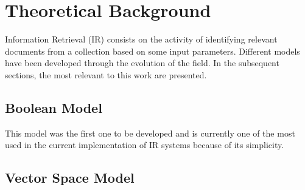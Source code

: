 \chapter{Theoretical Background}
\label{chapter-theoretical_background}
Information Retrieval (IR) consists on the activity of identifying relevant documents from a collection based on some input parameters.
Different models have been developed through the evolution of the field. In the subsequent sections, the most relevant to this work are presented.

\section{Boolean Model}
This model was the first one to be developed and is currently one of the most used in the current implementation of IR systems because of its simplicity.

\section{Vector Space Model}



\thispagestyle{empty}



